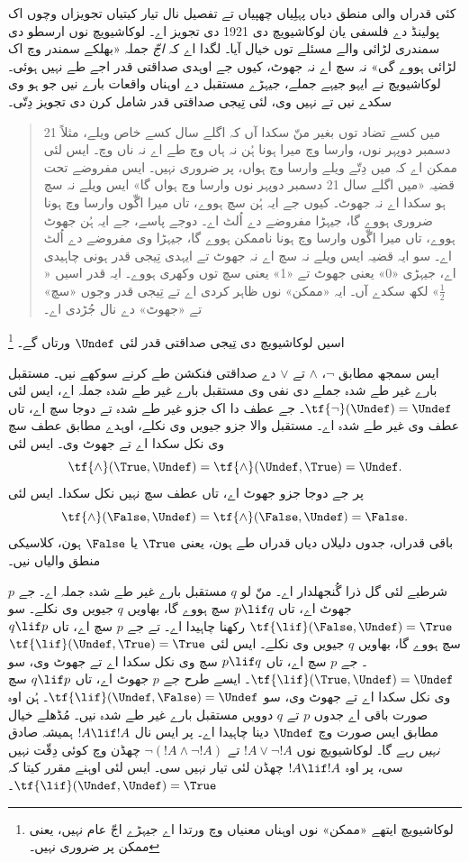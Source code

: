 \documentclass[../../../include/open-logic-section]{subfiles}
\begin{document}


کئی قدراں والی منطق دیاں پہلِیاں چھپیاں تے تفصیل نال تیار
کیتیاں تجویزاں وچوں اک پولینڈ دے فلسفی یان لوکاشیویچ دی 1921
دی تجویز اے۔ لوکاشیویچ نوں ارسطو دی سمندری لڑائی والے مسئلے
توں خیال آیا۔ لگدا اے کہ \emph{اجّ} جملہ «بھلکے سمندر وچ
اک لڑائی ہووے گی» نہ سچ اے نہ جھوٹ، کیوں جے اوہدی صداقتی قدر
اجے طے نہیں ہوئی۔ لوکاشیویچ نے ایہو جیہے جملے، جیہڑے مستقبل
دے اوہناں واقعات بارے نیں جو ہو وی سکدے نیں تے نہیں وی،
لئی تِیجی صداقتی قدر شامل کرن دی تجویز دِتّی۔
\begin{quote}
میں کسے تضاد توں بغیر منّ سکدا آں کہ اگلے سال کسے خاص ویلے،
مثلاً 21 دسمبر دوپہر نوں، وارسا وچ میرا ہونا ہُن نہ ہاں وچ
طے اے نہ ناں وچ۔ ایس لئی ممکن اے کہ میں دِتّے ویلے وارسا
وچ ہواں، پر ضروری نہیں۔ ایس مفروضے تحت قضیہ «میں اگلے سال
21 دسمبر دوپہر نوں وارسا وچ ہواں گا» ایس ویلے نہ سچ ہو سکدا
اے نہ جھوٹ۔ کیوں جے ایہ ہُن سچ ہووے، تاں میرا اگّوں وارسا
وچ ہونا ضروری ہووے گا، جیہڑا مفروضے دے اُلٹ اے۔ دوجے پاسے،
جے ایہ ہُن جھوٹ ہووے، تاں میرا اگّوں وارسا وچ ہونا ناممکن
ہووے گا، جیہڑا وی مفروضے دے اُلٹ اے۔ سو ایہ قضیہ ایس ویلے
نہ سچ اے نہ جھوٹ تے ایہدی تِیجی قدر ہونی چاہیدی اے، جیہڑی
«0» یعنی جھوٹ تے «1» یعنی سچ توں وکھری ہووے۔ ایہ قدر
اسیں «$\frac{1}{2}$» لکھ سکدے آں۔ ایہ «ممکن» نوں ظاہر
کردی اے تے تِیجی قدر وجوں «سچ» تے «جھوٹ» دے نال جُڑدی اے۔
\end{quote}
اسیں لوکاشیویچ دی تِیجی صداقتی قدر لئی $\Undef$ ورتاں گے۔
\footnote{لوکاشیویچ ایتھے «ممکن» نوں اوہناں معنیاں وچ ورتدا
اے جیہڑے اجّ عام نہیں، یعنی ممکن پر ضروری نہیں۔}

ایس سمجھ مطابق $\lnot$، $\land$ تے $\lor$ دے صداقتی
فنکشن طے کرنے سوکھے نیں۔ مستقبل بارے غیر طے شدہ جملے دی
نفی وی مستقبل بارے غیر طے شدہ جملہ اے، ایس لئی
$\tf{\lnot}(\Undef) = \Undef$۔ جے عطف دا اک جزو غیر طے
شدہ تے دوجا سچ اے، تاں عطف وی غیر طے شدہ اے۔ مستقبل والا
جزو جیویں وی نکلے، اوہدے مطابق عطف سچ وی نکل سکدا اے تے
جھوٹ وی۔ ایس لئی
\[
    \tf{\land}(\True, \Undef) =
\tf{\land}(\Undef, \True) =
\Undef.
\]
پر جے دوجا جزو جھوٹ اے، تاں عطف سچ نہیں نکل سکدا۔ ایس لئی
\[\tf{\land}(\False, \Undef) =
\tf{\land}(\False, \Undef) = \False.\]
باقی قدراں، جدوں دلیلاں دیاں قدراں طے ہون، یعنی $\True$
یا $\False$ ہون، کلاسیکی منطق والیاں نیں۔

شرطیے لئی گل ذرا گُنجھلدار اے۔ منّ لو $q$ مستقبل بارے غیر
طے شدہ جملہ اے۔ جے $p$ جھوٹ اے، تاں $p \lif q$ سچ ہووے گا،
بھاویں $q$ جیویں وی نکلے۔ سو $\tf{\lif}(\False, \Undef) = \True$
رکھنا چاہیدا اے۔ تے جے $p$ سچ اے، تاں $q \lif p$ سچ ہووے گا،
بھاویں $q$ جیویں وی نکلے۔ ایس لئی $\tf{\lif}(\Undef, \True) = \True$۔
جے $p$ سچ اے، تاں $p
\lif q$ سچ وی نکل سکدا اے تے جھوٹ وی، سو $\tf{\lif}(\True,
\Undef) = \Undef$۔ ایسے طرح جے $p$ جھوٹ اے، تاں $q
\lif p$ سچ وی نکل سکدا اے تے جھوٹ وی، سو
$\tf{\lif}(\Undef, \False) = \Undef$۔ ہُن اوہ صورت باقی اے
جدوں $p$ تے $q$ دوویں مستقبل بارے غیر طے شدہ نیں۔ مُڈھلے
خیال مطابق ایس صورت وچ $\Undef$ دینا چاہیدا اے۔ پر ایس
نال $!A \lif !A$ ہمیشہ صادق \emph{نہیں} رہے گا۔ لوکاشیویچ
نوں $!A \lor \lnot !A$ تے $\lnot(!A
\land \lnot !A)$ چھڈن وچ کوئی دِقّت نہیں سی، پر اوہ $!A \lif !A$
چھڈن لئی تیار نہیں سی۔ ایس لئی اوہنے مقرر کیتا کہ
$\tf{\lif}(\Undef, \Undef) =
\True$۔
\end{document}
